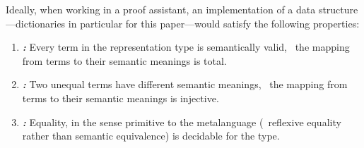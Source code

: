 



Ideally, when working in a proof assistant, an implementation of a data structure---dictionaries in particular for this paper---would satisfy the following properties:

\newcommand{\designGoal}[1]
  {\textbf{\emph{#1:}}}

\begin{enumerate}

\item
%
\designGoal{\SemTot}
%
Every term in the representation type is semantically valid, \ie{}~the mapping from terms to their semantic meanings is total.

\item
%
\designGoal{\SemInj}
%
Two unequal terms have different semantic meanings, \ie{}~the mapping from terms to their semantic meanings is injective.

\item
%
\designGoal{\EqDec}
%
Equality, in the sense primitive to the metalanguage (\ie{}~reflexive equality rather than semantic equivalence) is decidable for the type.
\\ 

\end{enumerate}

